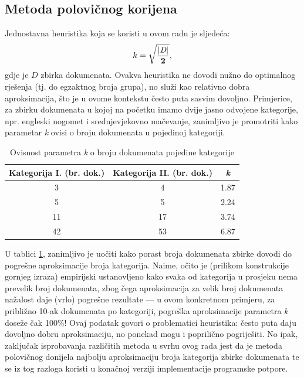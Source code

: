 \documentclass[times, utf8, zavrsni]{fer}
\begin{document}

%

\subsection{Metoda polovičnog korijena}

Jednostavna heuristika koja se koristi u ovom radu je sljedeća:
\begin{equation}
{k}={\mathbf {\sqrt{|\textit{D}| \over 2}}},
\end{equation}
gdje je $D$ zbirka dokumenata. Ovakva heuristika ne dovodi nužno do optimalnog rješenja (tj. do egzaktnog broja grupa), no služi kao relativno dobra aproksimacija, što je u ovome kontekstu često puta sasvim dovoljno. Primjerice, za zbirku dokumenata u kojoj na početku imamo dvije jasno odvojene kategorije, npr. engleski nogomet i srednjevjekovno mačevanje, zanimljivo je promotriti kako parametar \textit{k} ovisi o broju dokumenata u pojedinoj kategoriji.

\begin{table}
\begin{center}
\begin{tabular}{|c|c|c|}
\hline
Kategorija I. (br. dok.) & Kategorija II. (br. dok.) & \textit{k} \\
\hline
3 & 4 & 1.87 \\
5 & 5 & 2.24 \\
11 & 17 & 3.74 \\
42 & 53 & 6.87 \\
\hline
\end{tabular}
\end{center}
\caption{Ovisnost parametra \textit{k} o broju dokumenata pojedine kategorije}
\label{table:kmeans}
\end{table}

U tablici \ref{table:kmeans}, zanimljivo je uočiti kako porast broja dokumenata zbirke dovodi do pogrešne aproksimacije broja kategorija. Naime, očito je (prilikom konstrukcije gornjeg izraza) empirijski ustanovljeno kako svaka od kategorija u prosjeku nema prevelik broj dokumenata, zbog čega aproksimacija za velik broj dokumenata nažalost daje (vrlo) pogrešne rezultate — u ovom konkretnom primjeru, za približno 10-ak dokumenata po kategoriji, pogreška aproksimacije parametra \textit{k} doseže čak 100\%! Ovaj podatak govori o problematici heuristika: često puta daju dovoljno dobru aproksimaciju, no ponekad mogu i poprilično pogriješiti.
No ipak, zaključak isprobavanja različitih metoda u svrhu ovog rada jest da je metoda polovičnog donijela najbolju aproksimaciju broja kategorija zbirke dokumenata te se iz tog razloga koristi u konačnoj verziji implementacije programske potpore.
\end{document}
